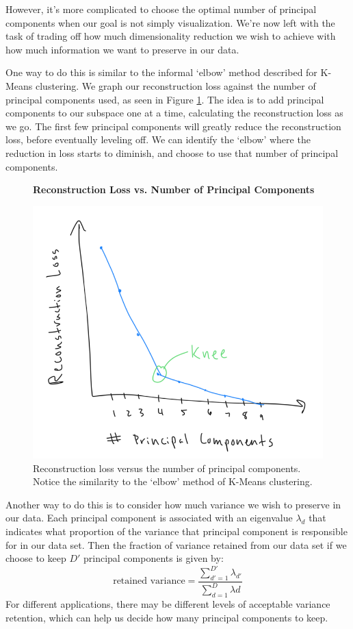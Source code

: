 However, it's more complicated to choose the optimal number of principal components when our goal is not simply visualization. We're now left with the task of trading off how much dimensionality reduction we wish to achieve with how much information we want to preserve in our data.

One way to do this is similar to the informal `elbow' method described for K-Means clustering. We graph our reconstruction loss against the number of principal components used, as seen in Figure \ref{fig:RL-vs-PC}. The idea is to add principal components to our subspace one at a time, calculating the reconstruction loss as we go. The first few principal components will greatly reduce the reconstruction loss, before eventually leveling off. We can identify the `elbow' where the reduction in loss starts to diminish, and choose to use that number of principal components.

\begin{figure}
    \centering
    \textbf{Reconstruction Loss vs. Number of Principal Components}\par\medskip
    \includegraphics[width=0.5\paperwidth]{../DimensionalityReduction/fig/RL-vs-PC.png}
    \caption{Reconstruction loss versus the number of principal components. Notice the similarity to the `elbow' method of K-Means clustering.}
    \label{fig:RL-vs-PC}
\end{figure}

Another way to do this is to consider how much variance we wish to preserve in our data. Each principal component is associated with an eigenvalue $\lambda_{d}$ that indicates what proportion of the variance that principal component is responsible for in our data set. Then the fraction of variance retained from our data set if we choose to keep $D'$ principal components is given by:
\begin{equation} \label{variance-retention}
    \text{retained variance} = \frac{\sum_{d'=1}^{D'} \lambda_{d'}}{\sum_{d=1}^{D} \lambda{d}}
\end{equation}
For different applications, there may be different levels of acceptable variance retention, which can help us decide how many principal components to keep.


